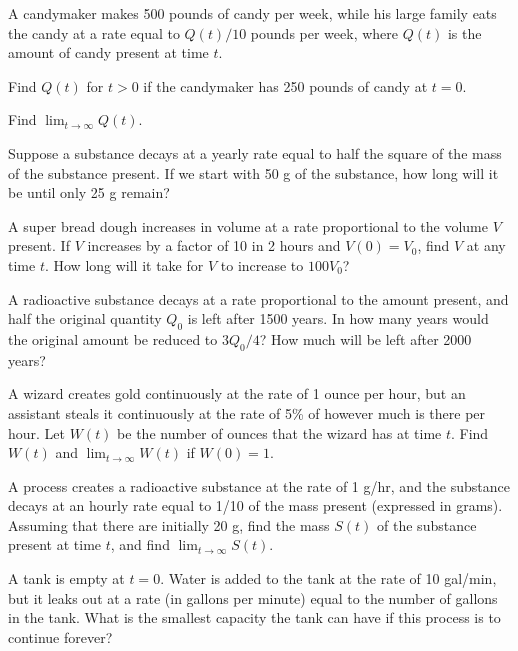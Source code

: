 \begin{exerciselist}
\item\label{exer:4.1.11}A candymaker makes 500 pounds of candy per week, while
his large family eats the candy at a rate equal to $Q(t)/10$
pounds per week, where $Q(t)$ is the amount of candy present
at time $t$.
\begin{alist}
\item %
Find $Q(t)$ for $t > 0$ if the candymaker has 250 pounds of
candy at $t=0$.
\item %
Find $\lim_{t\to\infty} Q(t)$.
\end{alist}

\item\label{exer:4.1.12}Suppose a substance decays at a yearly rate  equal
to half the square of the mass of the substance present.  If
we start with 50 g of the substance, how long will it be
until only 25 g remain?

\item\label{exer:4.1.13}A super bread dough increases in volume at a rate
proportional to the volume $V$ present.  If $V$ increases by
a factor of 10 in 2 hours and $V(0)=V_0$, find $V$ at any
time $t$.  How long will it take for $V$ to increase to $100
V_0$?

\item\label{exer:4.1.14}A radioactive substance decays at a rate proportional to the
amount present, and half the original quantity $Q_0$ is left
after 1500 years. In how many years would the original
amount be reduced to $3Q_0/4$?  How much will be
left after 2000 years?


\item\label{exer:4.1.15}A wizard creates gold continuously at the rate of 1 ounce
per hour, but an assistant steals it continuously at the
rate of 5\% of however much  is there per hour.  Let $W(t)$
be the number of ounces that the wizard has at time $t$.
Find $W(t)$ and $\lim_{t\to\infty}W(t)$ if  $W(0)=1$.

\item\label{exer:4.1.16}A process creates a radioactive substance at the rate of 1
g/hr, and the substance decays at an hourly rate
 equal to 1/10 of the mass present (expressed in
grams).  Assuming that there are initially 20 g, find
the mass $S(t)$ of the substance present at time $t$, and
find $\lim_{t\to\infty} S(t)$.

\item\label{exer:4.1.17}A tank is empty at $t=0$.  Water is added to the tank at
the rate of 10 gal/min, but it leaks out at a rate
 (in gallons per minute)  equal to the number of
gallons in the tank.  What is the smallest capacity the tank
can have if this process is to continue forever?


\end{exerciselist}
